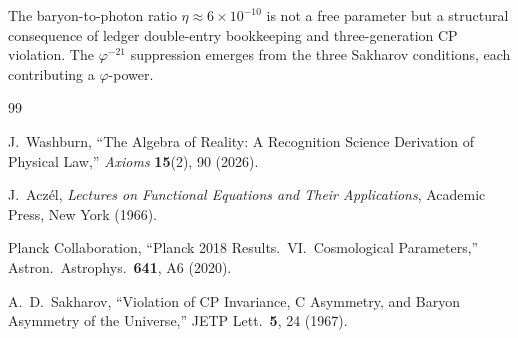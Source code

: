 \documentclass[12pt,a4paper]{article}
\theoremstyle{definition}
\theoremstyle{remark}
\begin{document}
The baryon-to-photon ratio $\eta \approx 6 \times 10^{-10}$ is
not a free parameter but a structural consequence of ledger
double-entry bookkeeping and three-generation CP violation.  The
$\varphi^{-21}$ suppression emerges from the three Sakharov
conditions, each contributing a $\varphi$-power.

\begin{thebibliography}{99}

J.~Washburn, ``The Algebra of Reality: A Recognition Science Derivation
of Physical Law,'' \emph{Axioms} \textbf{15}(2), 90 (2026).

J.~Acz\'el, \textit{Lectures on Functional Equations and Their Applications},
Academic Press, New York (1966).

Planck Collaboration, ``Planck 2018 Results.\ VI.\ Cosmological
Parameters,'' Astron.\ Astrophys.\ \textbf{641}, A6 (2020).

A.~D.~Sakharov, ``Violation of CP Invariance, C Asymmetry, and
Baryon Asymmetry of the Universe,'' JETP Lett.\ \textbf{5}, 24
(1967).

\end{thebibliography}
\end{document}
